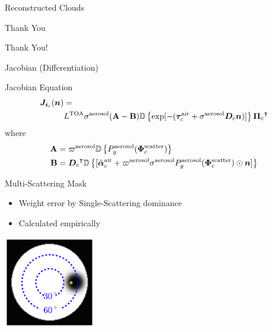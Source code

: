 \documentclass[compress,red,12pt]{beamer}
\newcommand{\vect}[1]{\bm{#1}}
\newcommand{\transpose}[1]{{#1}^\intercal}
\newcommand{\OpDiag}[1]{\mathbb{D}\left\{#1\right\}}
\begin{document}

\begin{frame}[label=current]{Reconstructed Clouds}
  \centerline{}
\end{frame}


\begin{frame}{Thank You}
  \begin{center}
    Thank You!
  \end{center}
\end{frame}


\appendix

\begin{frame}[label=jacobian]{Jacobian (Differentiation)}
  \begin{block}{Jacobian Equation}
    \begin{align*}
      {\bm J}_{{\bm i}_c}({\bm n}) &= \\
      &L^{\rm TOA}{\sigma}^{\rm
        aerosol}({\bf A}-{\bf B}) \OpDiag{\exp[-(\vect{\tau}_c^{\rm air} +
        {\sigma}^{\rm aerosol} {\bm D}_c {\bm n})]}
      \transpose{{\vect{\Pi}}_c}
    \end{align*}
    where
    \begin{align*}
      {\bf A} &= \varpi^{\rm aerosol}
      \OpDiag{ P_g^{\rm aerosol}(\vect{\Phi}^{\rm scatter}_c)} \\
      {\bf B} &= \transpose{{\bm D}_c}
      \OpDiag{[\tilde{\vect{\alpha}}^{\rm air}_c + \varpi^{\rm
          aerosol}\sigma^{\rm aerosol} P^{\rm aerosol}_g(\vect{\Phi}^{\rm
          scatter}_c) \odot{\bm n}    ]}
    \end{align*}
  \end{block}
  \hfill\hyperlink{gradient}{}
\end{frame}

\begin{frame}[label=mask]{Multi-Scattering Mask}
  \begin{itemize}
  \item Weight error by Single-Scattering dominance
  \item Calculated empirically
  \end{itemize}
  \centerline{\includegraphics[height=4cm]{images/sun_mask.pdf}}
  \hfill\hyperlink{objective<3>}{} 
\end{frame}
\end{document}
